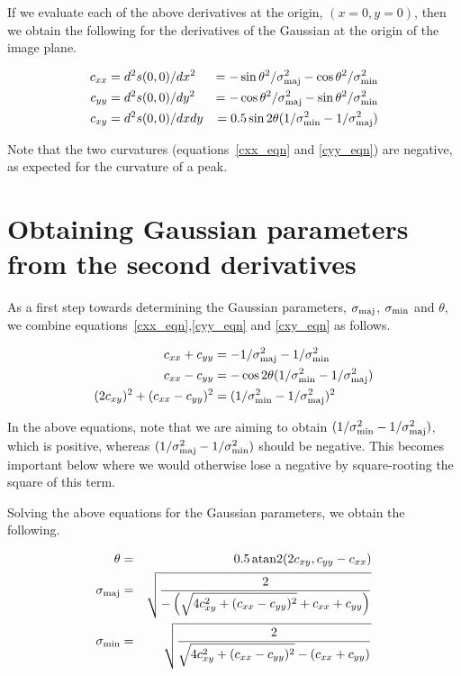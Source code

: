 \documentclass[11pt]{article}
\newcommand{\bpa}{\theta}
\newcommand{\minor}{\sigma_{\mbox{\scriptsize min}}}
\newcommand{\major}{\sigma_{\mbox{\scriptsize maj}}}
\newcommand{\arctantwo}[2]{\mbox{\,atan2}( #1, #2 )}
\newcommand{\cxx}{c_{xx}}
\newcommand{\cyy}{c_{yy}}
\newcommand{\cxy}{c_{xy}}
\begin{document}
If we evaluate each of the above derivatives at the origin,
$(x=0,y=0)$, then we obtain the following for the derivatives of the
Gaussian at the origin of the image plane.

\begin{align}
\label{cxx_eqn}
    \cxx &= d^2s(0,0)/dx^2 &= -\sin{\bpa}^2 / \major^2 - \cos{\bpa}^2 / \minor^2\\
\label{cyy_eqn}
    \cyy &= d^2s(0,0)/dy^2 &= -\cos{\bpa}^2 / \major^2 - \sin{\bpa}^2 / \minor^2\\
\label{cxy_eqn}
    \cxy &= d^2s(0,0)/dxdy &= 0.5  \sin{2\bpa}  (1/\minor^2 - 1/\major^2)
\end{align}

Note that the two curvatures (equations~\ref{cxx_eqn} and
\ref{cyy_eqn}) are negative, as expected for the curvature of a peak.

\section{Obtaining Gaussian parameters from the second derivatives}

As a first step towards determining the Gaussian parameters, $\major$,
$\minor$ and $\bpa$, we combine equations~\ref{cxx_eqn},\ref{cyy_eqn}
and \ref{cxy_eqn} as follows.

\begin{align}
    \cxx + \cyy &= -1/\major^2 - 1/\minor^2 \\
    \cxx - \cyy &= -\cos{2\bpa}  (1/\minor^2 - 1/\major^2)\\
    (2 \cxy)^2 + (\cxx-\cyy)^2 &= (1/\minor^2 - 1/\major^2)^2
\end{align}

In the above equations, note that we are aiming to obtain $(1/\minor^2
- 1/\major^2)$, which is positive, whereas $(1/\major^2 - 1/\minor^2)$
should be negative. This becomes important below where we would
otherwise lose a negative by square-rooting the square of this term.

Solving the above equations for the Gaussian parameters, we obtain the
following.

\begin{eqnarray}
  \label{bpa_im_eqn}
    \bpa &=& 0.5  \arctantwo{2\cxy}{\cyy-\cxx}\\
  \label{major_im_eqn}
    \major &=& \sqrt{\frac{2}{-\left(\sqrt{4\cxy^2 + (\cxx-\cyy)^2} + \cxx+\cyy\right)}}\\
  \label{minor_im_eqn}
    \minor &=& \sqrt{\frac{2}{\sqrt{4\cxy^2 + (\cxx-\cyy)^2} - (\cxx+\cyy)}}
\end{eqnarray}
\end{document}
